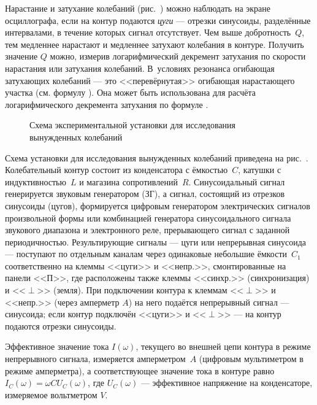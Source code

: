 Нарастание и затухание 
колебаний (рис.~) можно наблюдать 
на экране осциллографа, если на контур подаются \emph{цуги} --- отрезки 
синусоиды, разделённые интервалами, в течение которых сигнал отсутствует. 
Чем выше добротность~$Q$, тем медленнее 
нарастают и медленнее затухают колебания в контуре. Получить значение $Q$ 
можно, измерив логарифмический декремент затухания по скорости 
нарастания или затухания колебаний. В~условиях резонанса огибающая затухающих 
колебаний --- это <<перевёрнутая>> огибающая нарастающего участка 
(см. формулу ).
Она может быть использована для расчёта логарифмического декремента затухания
по формуле .


\begin{figure}[h!]
    \centering\small	
    \caption{Схема экспериментальной установки для исследования вынужденных
        колебаний}
\end{figure}


\experiment 

Схема установки для исследования вынужденных колебаний приведена 
на рис.~. 
Колебательный контур состоит из конденсатора с ёмкостью~$C$, 
катушки с индуктивностью~$L$ и магазина сопротивлений~$R$. 
Синусоидальный сигнал генерируется звуковым генератором (ЗГ), 
а сигнал, состоящий из отрезков синусоиды (цугов), формируется цифровым 
генератором электрических сигналов произвольной формы или комбинацией 
генератора синусоидального сигнала звукового диапазона и электронного реле, 
прерывающего сигнал с заданной периодичностью. Результирующие сигналы ---
цуги или непрерывная синусоида --- поступают по отдельным каналам через 
одинаковые небольшие ёмкости~$C_1$ соответственно на клеммы 
<<цуги>> и <<непр.>>, смонтированные на панели <<П>>, 
где расположены также клеммы <<синхр.>> (синхронизация) и <<$\perp$>> (земля). 
При подключении контура к клеммам <<$\perp$>> и <<непр.>> (через амперметр $A$)
на него подаётся непрерывный сигнал --- синусоида; 
если контур подключён <<цуги>> и <<$\perp$>> --- на контур подаются 
отрезки синусоиды.

Эффективное значение тока $I(\omega)$, текущего во внешней цепи контура 
в режиме непрерывного сигнала, измеряется амперметром~$A$ 
(цифровым мультиметром в режиме амперметра), а соответствующее значение тока 
в контуре равно $I_C(\omega)=\omega C U_C(\omega)$,
где $U_C(\omega)$ --- эффективное напряжение на конденсаторе, 
измеряемое вольтметром $V$.


